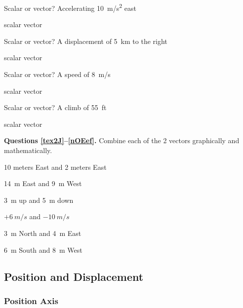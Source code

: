 \documentclass[answers]{exam}
\begin{document}
\begin{questions}
\question
Scalar or vector? Accelerating \SI{10}{m/s^2} east

\begin{randomizechoices}[norandomize]
    \choice scalar
    \correctchoice vector
\end{randomizechoices}


\question
Scalar or vector? A displacement of \SI{5}{km} to the right

\begin{randomizechoices}[norandomize]
    \choice scalar
    \correctchoice vector
\end{randomizechoices}

\question 
Scalar or vector? A speed of \SI{8}{m/s}

\begin{randomizechoices}[norandomize]
    \correctchoice scalar
    \choice vector
\end{randomizechoices}

\question \label{scalar-last}
Scalar or vector?
A climb of \SI{55}{ft}

\begin{randomizechoices}[norandomize]
    \correctchoice scalar
    \choice vector
\end{randomizechoices}

\begin{EnvUplevel}
    \textbf{Questions \ref{tex2J}--\ref{nOEef}.} Combine each of the 2 vectors graphically and mathematically.
\end{EnvUplevel} 

\question \label{tex2J}
10 meters East and 2 meters East

\question
\SI{14}{m} East and \SI{9}{m} West

\question
\SI{3}{m} up and \SI{5}{m} down

\question 
$+\SI{6}{m/s}$ and $-\SI{10}{m/s}$

\question
\SI{3}{m} North and \SI{4}{m} East

\question \label{nOEef}
\SI{6}{m} South and \SI{8}{m} West


\end{questions}

\subsection{Position and Displacement}

\subsubsection{Position Axis}
\end{document}
